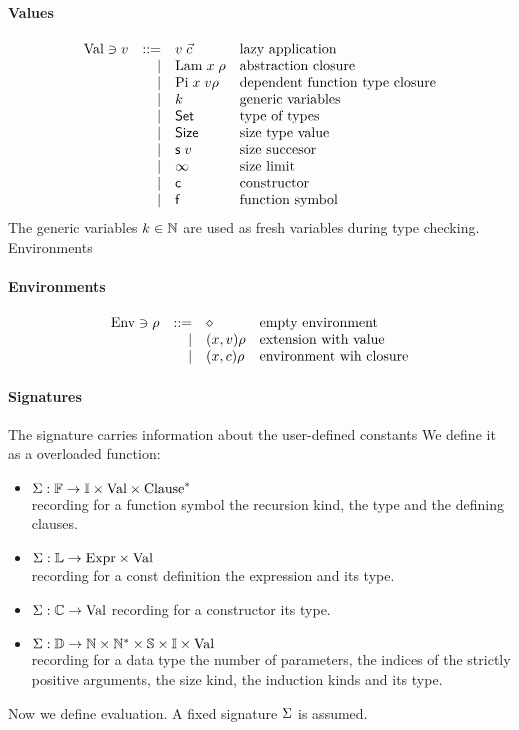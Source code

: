 \paragraph*{Values}
\[
\begin{array}{lrll}
\mathrm{Val} \ni v & ::= & v \; \vec{c} & \mbox{lazy application}\\
& \mid & \mathrm{Lam} \; x \; \rho & \mbox{abstraction closure}\\
& \mid & \mathrm{Pi} \; x \; v \rho & \mbox{dependent function type closure}\\
& \mid & k & \mbox{generic variables}\\
& \mid & \mathsf{Set} & \mbox{type of types} \\
& \mid & \mathsf{Size} & \mbox{size type value}\\
& \mid & \mathsf{s}\; v & \mbox{size succesor}\\
& \mid & \infty & \mbox{size limit}\\
& \mid & \mathsf{c} & \mbox{constructor}\\
& \mid & \mathsf{f} & \mbox{function symbol}\\
\end{array}
\]
The generic variables $k \in \mathbb{N} $ are used as fresh variables during type checking.
Environments
\paragraph*{Environments}
\[
\begin{array}{lrll}
\mathrm{Env} \ni \rho & ::= & \diamond & \mbox{empty environment}\\
& \mid & (x,v) \rho & \mbox{extension with value}\\
& \mid & (x,c) \rho & \mbox{environment wih closure} 
\end{array}
\]

\paragraph*{Signatures}
The signature carries information about the user-defined constants
We define it as a overloaded function:
\begin{itemize}
\item
$ \mathrm{\Sigma} : \mathbb{F} \rightarrow \mathbb{I} \times \mathrm{Val} \times {\mathrm{Clause}}^{\ast}$\\
recording for a function symbol the recursion kind, the type and the defining clauses.
\item
$ \mathrm{\Sigma} : \mathbb{L} \rightarrow \mathrm{Expr} \times \mathrm{Val} $ \\
recording for a const definition the expression and its type. 
\item
$ \mathrm{\Sigma} : \mathbb{C} \rightarrow \mathrm{Val} $
recording for a constructor its type.
\item
$ \mathrm{\Sigma} : \mathbb{D} \rightarrow \mathbb{N} \times {\mathbb{N}}^{\ast} \times \mathbb{S} \times \mathbb{I} \times \mathrm{Val} $\\
recording for a data type the number of parameters, the indices of the strictly positive arguments,
the size kind, the induction kinds and its type.
\end{itemize}
Now we define evaluation. A fixed signature $\mathrm{\Sigma}$ is assumed.

